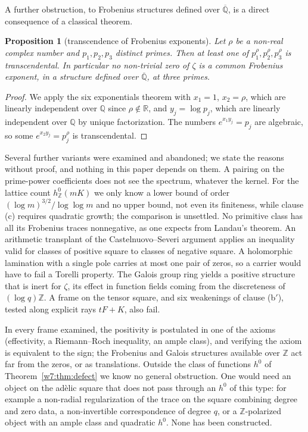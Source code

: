 \documentclass[11pt]{amsart}
\newtheorem{proposition}[theorem]{Proposition}
\theoremstyle{definition}
\theoremstyle{remark}
\numberwithin{equation}{section}
\newcommand{\R}{\mathbb{R}}
\newcommand{\Z}{\mathbb{Z}}
\newcommand{\Q}{\mathbb{Q}}
\begin{document}
A further obstruction, to Frobenius structures defined over $\overline{\Q}$, is a direct consequence of a
classical theorem.

\begin{proposition}[transcendence of Frobenius exponents]\label{w7:prop:rational}
Let $\rho$ be a non-real complex number and $p_1,p_2,p_3$ distinct primes. Then at least one of
$p_1^{\rho},p_2^{\rho},p_3^{\rho}$ is transcendental. In particular no non-trivial zero of $\zeta$ is a common
Frobenius exponent, in a structure defined over $\overline{\Q}$, at three primes.
\end{proposition}

\begin{proof}
We apply the six exponentials theorem \cite{Lang1966} with $x_1=1$, $x_2=\rho$, which are linearly independent
over $\Q$ since $\rho\notin\R$, and $y_j=\log p_j$, which are linearly independent over $\Q$ by unique
factorization. The numbers $e^{x_1y_j}=p_j$ are algebraic, so some $e^{x_2y_j}=p_j^\rho$ is transcendental.
\end{proof}

Several further variants were examined and abandoned; we state the reasons without proof, and nothing in this
paper depends on them. A pairing on the prime-power coefficients does not see the spectrum, whatever the kernel.
For the lattice count $h^0_\Z(mK)$ we only know a lower bound of order $(\log m)^{3/2}/\log\log m$ and no upper
bound, not even its finiteness, while clause (c) requires quadratic growth; the comparison is unsettled. No
primitive class has all its Frobenius traces nonnegative, as one expects from Landau's theorem. An arithmetic
transplant of the Castelnuovo--Severi argument applies an inequality valid for classes of positive square to
classes of negative square. A holomorphic lamination with a single pole carries at most one pair of zeros, so a
carrier would have to fail a Torelli property. The Galois group ring yields a positive structure that is inert
for $\zeta$, its effect in function fields coming from the discreteness of $(\log q)\Z$. A frame on the tensor
square, and six weakenings of clause (b$'$), tested along explicit rays $tF+K$, also fail.

In every frame examined, the positivity is postulated in one of the axioms (effectivity, a Riemann--Roch
inequality, an ample class), and verifying the axiom is equivalent to the sign; the Frobenius and Galois
structures available over $\Z$ act far from the zeros, or as translations. Outside the class of functions $h^0$
of Theorem~\ref{w7:thm:defect} we know no general obstruction. One would need an object on the ad\`elic square
that does not pass through an $h^0$ of this type: for example a non-radial regularization of the trace on the
square combining degree and zero data, a non-invertible correspondence of degree $q$, or a $\Z$-polarized
object with an ample class and quadratic $h^0$. None has been constructed.
\end{document}
